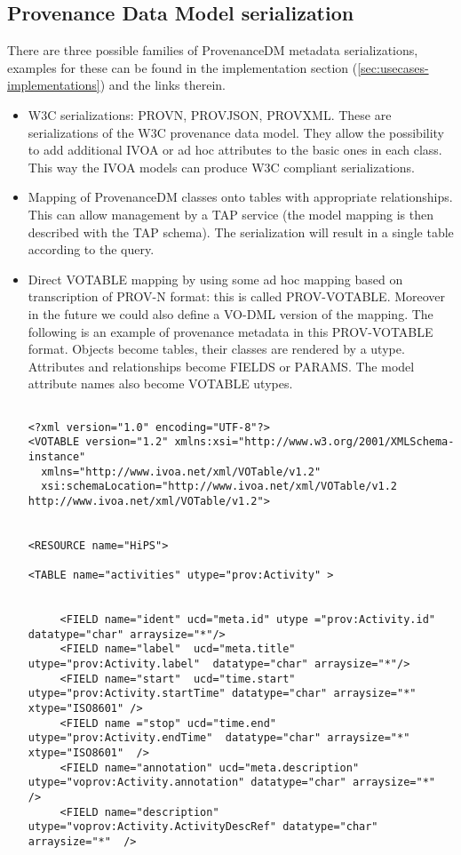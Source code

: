 \subsection{Provenance Data Model serialization}
There are three possible families of ProvenanceDM metadata serializations, examples for these can be found in the implementation section (\ref{sec:usecases-implementations}) and the links therein.
\begin{itemize}
 \item W3C serializations: PROV\-N, PROV\-JSON, PROV\-XML. These are serializations of the W3C provenance data model. They allow the possibility to add additional IVOA or ad hoc attributes to the basic ones in each class. This way the IVOA models can produce W3C compliant serializations.
 \item Mapping of ProvenanceDM classes onto tables with appropriate relationships. This can allow management by a TAP service (the model mapping is then described with the TAP schema). The serialization will result in a single table according to the query.


 \item Direct VOTABLE mapping by using some ad hoc mapping based on transcription of PROV-N format: this is called PROV-VOTABLE. Moreover in the future we could also define a VO-DML \citep{std:VODML} version of the mapping.
The following is an example of provenance metadata in this PROV-VOTABLE format. Objects become tables, their classes are rendered by a utype. Attributes and relationships become FIELDS or PARAMS. The model attribute names also become VOTABLE utypes.  
\begin{verbatim}

<?xml version="1.0" encoding="UTF-8"?>
<VOTABLE version="1.2" xmlns:xsi="http://www.w3.org/2001/XMLSchema-instance"
  xmlns="http://www.ivoa.net/xml/VOTable/v1.2"
  xsi:schemaLocation="http://www.ivoa.net/xml/VOTable/v1.2 http://www.ivoa.net/xml/VOTable/v1.2">


<RESOURCE name="HiPS">

<TABLE name="activities" utype="prov:Activity" >

     
     <FIELD name="ident" ucd="meta.id" utype ="prov:Activity.id" datatype="char" arraysize="*"/>
     <FIELD name="label"  ucd="meta.title" utype="prov:Activity.label"  datatype="char" arraysize="*"/>
     <FIELD name="start"  ucd="time.start" utype="prov:Activity.startTime" datatype="char" arraysize="*" xtype="ISO8601" />
     <FIELD name ="stop" ucd="time.end" utype="prov:Activity.endTime"  datatype="char" arraysize="*" xtype="ISO8601"  />
     <FIELD name="annotation" ucd="meta.description" utype="voprov:Activity.annotation" datatype="char" arraysize="*"  />
     <FIELD name="description" utype="voprov:Activity.ActivityDescRef" datatype="char" arraysize="*"  />  


\end{verbatim}
\end{itemize}
